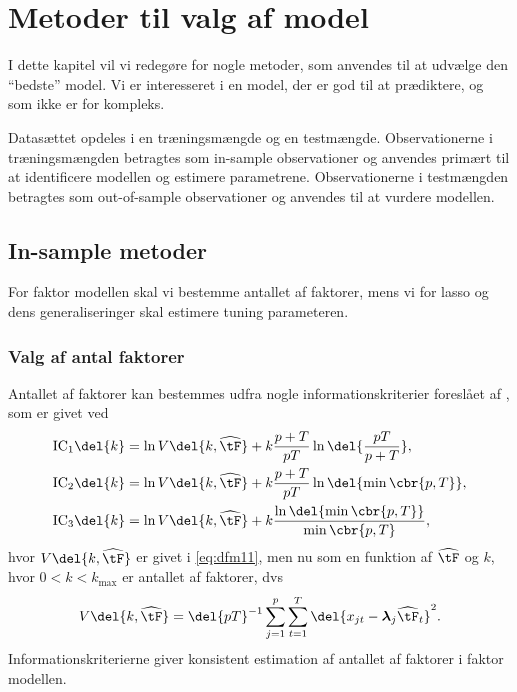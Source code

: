 \chapter{Metoder til valg af model} \label{ch:metoder}
I dette kapitel vil vi redegøre for nogle metoder, som anvendes til at udvælge den ``bedste'' model. 
Vi er interesseret i en model, der er god til at prædiktere, og som ikke er for kompleks.

Datasættet opdeles i en træningsmængde og en testmængde. 
Observationerne i træningsmængden betragtes som in-sample observationer og anvendes primært til at identificere modellen og estimere parametrene. 
Observationerne i testmængden betragtes som out-of-sample observationer og anvendes til at vurdere modellen. 
 
\section{In-sample metoder}
For faktor modellen skal vi bestemme antallet af faktorer, mens vi for lasso og dens generaliseringer skal estimere tuning parameteren.

\subsection{Valg af antal faktorer} \label{sec:faktorer}
Antallet af faktorer kan bestemmes udfra nogle informationskriterier foreslået af \citep{Bai_Ng}, som er givet ved
\begin{align}
\text{IC}_1 \del{k} &= \ln V \del{k, \widehat{\tF}} + k \frac{p + T}{p T} \ln \del{\frac{p T}{p + T}}, \label{eq:ic1} \\
\text{IC}_2 \del{k} &= \ln V \del{k, \widehat{\tF}} + k \frac{p + T}{p T} \ln \del{ \min \cbr{p, T}}, \label{eq:ic2} \\
\text{IC}_3 \del{k} &= \ln V \del{k, \widehat{\tF}} + k \frac{\ln \del{\min \cbr{p, T}}}{\min \cbr{p, T}}, \label{eq:ic3}
\end{align}
hvor \(V \del{k, \widehat{\tF}}\) er givet i \eqref{eq:dfm11}, men nu som en funktion af \(\widehat{\tF}\) og \(k\), hvor \(0<k<k_\text{max}\) er antallet af faktorer, dvs
\begin{align*}
V \del{k, \widehat{\tF}} = \del{p T}^{-1} \sum_{j=1}^p \sum_{t=1}^{T} \del{x_{jt} -\boldsymbol{\lambda}_j \widehat{\tF}_t}^2.
\end{align*}
Informationskriterierne giver konsistent estimation af antallet af faktorer i faktor modellen.

